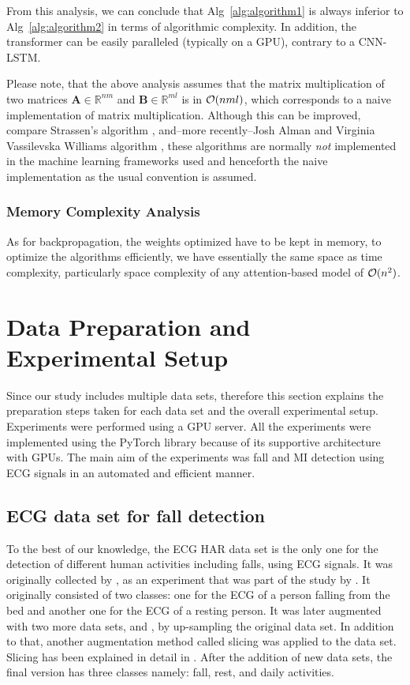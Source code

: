 \documentclass{ieeeaccess}
\begin{document}
From this analysis, we can conclude that Alg~\ref{alg:algorithm1} is always inferior to Alg~\ref{alg:algorithm2} in terms of algorithmic complexity. In addition, the transformer can be easily paralleled (typically on a GPU), contrary to a CNN-LSTM.

Please note, that the above analysis assumes that the matrix multiplication of two matrices $\mathbf{A}\in\mathbb{R}^{nm}$ and $\mathbf{B}\in\mathbb{R}^{ml}$ is in  ${\cal O} (nml)$, which corresponds to a naive implementation of matrix multiplication. Although this can be improved, compare Strassen's algorithm \cite{Strassen}, and--more recently--Josh Alman and Virginia Vassilevska Williams algorithm \cite{JoshEtAl}, these algorithms are normally \emph{not} implemented in the machine learning frameworks used and henceforth the naive implementation as the usual convention is assumed.

\subsubsection{Memory Complexity Analysis}
As for backpropagation, the weights optimized have to be kept in memory, to optimize the algorithms efficiently, we have essentially the same space as time complexity, particularly space complexity of any attention-based model of ${\cal O} (n^2)$.

\section{Data Preparation and Experimental Setup}
Since our study includes multiple data sets, therefore this section explains the preparation steps taken for each data set and the overall experimental setup.
Experiments were performed using a GPU server. All the experiments were implemented using the PyTorch library because of its supportive architecture with GPUs. The main aim of the experiments was fall and MI detection using ECG signals in an automated and efficient manner. 
\subsection{ECG data set for fall detection}
To the best of our knowledge, the ECG HAR data set is the only one for the detection of different human activities including falls, using ECG signals. It was originally collected by \cite{2021}, as an experiment that was part of the study by \cite{9233318}. It originally consisted of two classes: one for the ECG of a person falling from the bed and another one for the ECG of a resting person. It was later augmented with two more data sets, \cite{ysnc-gc65-20} and \cite{ECGdb}, by up-sampling the original data set. In addition to that, another augmentation method called slicing was applied to the data set. Slicing has been explained in detail in \cite{cui2016multiscale}. After the addition of new data sets, the final version has three classes namely: fall, rest, and daily activities. 
\end{document}
